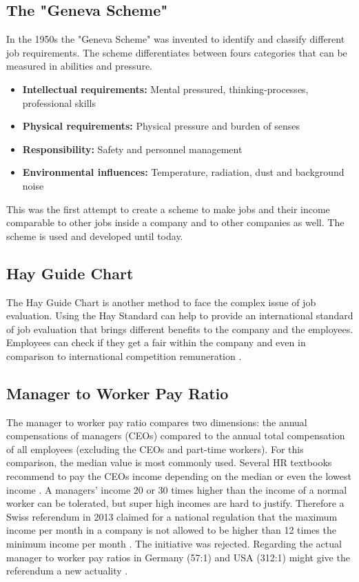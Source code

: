 \documentclass[11pt,a4paper]{article}
\begin{document}
\subsection{The "Geneva Scheme"}
In the 1950s the "Geneva Scheme" was invented to identify and classify
different job requirements. The scheme differentiates between fours categories
that can be measured in abilities and pressure.
\newpage
\begin{itemize}[noitemsep]
\item \textbf{Intellectual requirements:} Mental pressured,
  thinking-processes, professional skills
\item \textbf{Physical requirements:} Physical pressure and burden of senses
\item \textbf{Responsibility:} Safety and personnel management
\item \textbf{Environmental influences:} Temperature, radiation, dust and
  background noise
\end{itemize}
This was the first attempt to create a scheme to make jobs and their income
comparable to other jobs inside a company and to other companies as well. The
scheme is used and developed until today.

\subsection{Hay Guide Chart}
The Hay Guide Chart is another method to face the complex issue of job
evaluation. Using the Hay Standard can help to provide an international
standard of job evaluation that brings different benefits to the company and
the employees. Employees can check if they get a fair within the company and
even in comparison to international competition remuneration \cite{HAY}.
    
\subsection{Manager to Worker Pay Ratio}
The manager to worker pay ratio compares two dimensions: the annual
compensations of managers (CEOs) compared to the annual total compensation of
all employees (excluding the CEOs and part-time workers). For this comparison,
the median value is most commonly used. Several HR textbooks recommend to pay
the CEOs income depending on the median or even the lowest income
\cite{HOLTB}.  A managers' income 20 or 30 times higher than the income of a
normal worker can be tolerated, but super high incomes are hard to justify.
Therefore a Swiss referendum in 2013 claimed for a national regulation that
the maximum income per month in a company is not allowed to be higher than 12
times the minimum income per month \cite{VI}. The initiative was rejected.
Regarding the actual manager to worker pay ratios in Germany (57:1) and USA
(312:1) might give the referendum a new actuality \cite{HBS} \cite{FORBES}.
    
\end{document}
